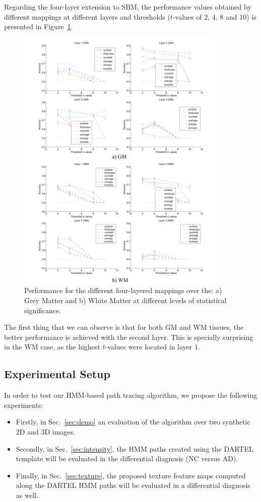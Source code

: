 Regarding the four-layer extension to \ac{SBM}, the performance values obtained by different mappings at different layers and thresholds ($t$-values of 2, 4, 8 and 10) is presented in Figure~\ref{fig:layeredPerf}. 

\begin{figure}[htp]
	\centering
	\includegraphics[width=0.9\textwidth]{Graphics/ch6/11-layerPerf}
	\caption{Performance for the different four-layered mappings over the: a) Grey Matter and b) White Matter at different levels of statistical significance.}
	\label{fig:layeredPerf}
\end{figure}

The first thing that we can observe is that for both \ac{GM} and \ac{WM} tissues, the better performance is achieved with the second layer. This is specially surprising in the \ac{WM} case, as the highest $t$-values were located in layer 1. 

\subsection{Experimental Setup}
In order to test our \ac{HMM}-based path tracing algorithm, we propose the following experiments: 
\begin{itemize}
	\item Firstly, in Sec.~\ref{sec:demo} an evaluation of the algorithm over two synthetic 2D and 3D images. 
	\item Secondly, in Sec.~\ref{sec:intensity}, the \ac{HMM} paths created using the DARTEL template will be evaluated in the differential diagnosis (NC versus AD). 
	\item Finally, in Sec.~\ref{sec:texture}, the proposed texture feature maps computed along the DARTEL \ac{HMM} paths will be evaluated in a differential diagnosis as well. 
\end{itemize}

